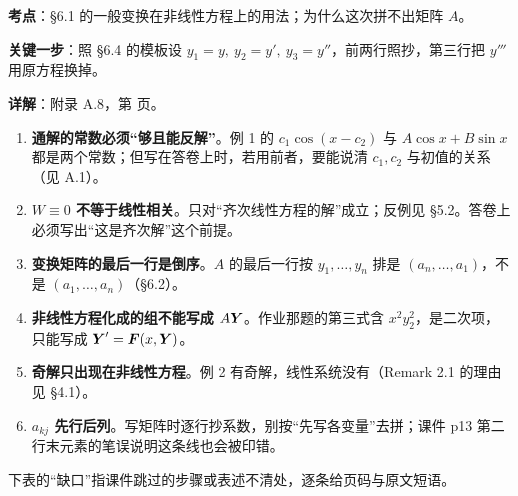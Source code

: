 \documentclass[11pt]{ctexart}
\renewcommand{\qbreak}{\needspace{0.26\textheight}}
\begin{document}

\qbreak
{}
\par\textbf{考点}：§6.1 的一般变换在非线性方程上的用法；为什么这次拼不出矩阵 $A$。
\par\textbf{关键一步}：照 §6.4 的模板设 $y_1=y,\ y_2=y',\ y_3=y''$，前两行照抄，第三行把 $y'''$ 用原方程换掉。
\par\textbf{详解}：附录 A.8，第 \pageref{app:a8} 页。


\begin{enumerate}
  \item \textbf{通解的常数必须“够且能反解”}。例 1 的 $c_1\cos(x-c_2)$ 与 $A\cos x+B\sin x$ 都是两个常数；但写在答卷上时，若用前者，要能说清 $c_1,c_2$ 与初值的关系（见 A.1）。
  \item \textbf{$W\equiv0$ 不等于线性相关}。只对“齐次线性方程的解”成立；反例见 §5.2。答卷上必须写出“这是齐次解”这个前提。
  \item \textbf{变换矩阵的最后一行是倒序}。$A$ 的最后一行按 $y_1,\dots,y_n$ 排是 $(a_n,\dots,a_1)$，不是 $(a_1,\dots,a_n)$（§6.2）。
  \item \textbf{非线性方程化成的组不能写成 $A\boldsymbol{Y}$}。作业那题的第三式含 $x^2y_2^2$，是二次项，只能写成 $\boldsymbol{Y}'=\boldsymbol{F}(x,\boldsymbol{Y})$。
  \item \textbf{奇解只出现在非线性方程}。例 2 有奇解，线性系统没有（Remark 2.1 的理由见 §4.1）。
  \item \textbf{$a_{kj}$ 先行后列}。写矩阵时逐行抄系数，别按“先写各变量”去拼；课件 p13 第二行末元素的笔误说明这条线也会被印错。
\end{enumerate}


下表的“缺口”指课件跳过的步骤或表述不清处，逐条给页码与原文短语。
\end{document}
